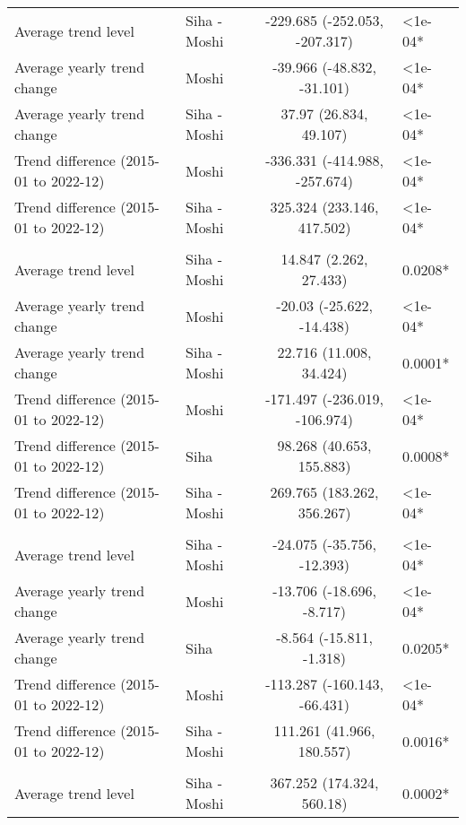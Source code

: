 \begin{longtable}{l|lcl}
\midrule\addlinespace[2.5pt]
\multicolumn{4}{l}{Neurological} \\[2.5pt] 
\midrule\addlinespace[2.5pt]
Average trend level & Siha - Moshi & -229.685 (-252.053, -207.317) & <1e-04* \\ 
Average yearly trend change & Moshi & -39.966 (-48.832, -31.101) & <1e-04* \\ 
Average yearly trend change & Siha - Moshi & 37.97 (26.834, 49.107) & <1e-04* \\ 
Trend difference (2015-01 to 2022-12) & Moshi & -336.331 (-414.988, -257.674) & <1e-04* \\ 
Trend difference (2015-01 to 2022-12) & Siha - Moshi & 325.324 (233.146, 417.502) & <1e-04* \\ 
\midrule\addlinespace[2.5pt]
\multicolumn{4}{l}{Other Communicable Diseases} \\[2.5pt] 
\midrule\addlinespace[2.5pt]
Average trend level & Siha - Moshi & 14.847 (2.262, 27.433) & 0.0208* \\ 
Average yearly trend change & Moshi & -20.03 (-25.622, -14.438) & <1e-04* \\ 
Average yearly trend change & Siha - Moshi & 22.716 (11.008, 34.424) & 0.0001* \\ 
Trend difference (2015-01 to 2022-12) & Moshi & -171.497 (-236.019, -106.974) & <1e-04* \\ 
Trend difference (2015-01 to 2022-12) & Siha & 98.268 (40.653, 155.883) & 0.0008* \\ 
Trend difference (2015-01 to 2022-12) & Siha - Moshi & 269.765 (183.262, 356.267) & <1e-04* \\ 
\midrule\addlinespace[2.5pt]
\multicolumn{4}{l}{Respiratory Diseases} \\[2.5pt] 
\midrule\addlinespace[2.5pt]
Average trend level & Siha - Moshi & -24.075 (-35.756, -12.393) & <1e-04* \\ 
Average yearly trend change & Moshi & -13.706 (-18.696, -8.717) & <1e-04* \\ 
Average yearly trend change & Siha & -8.564 (-15.811, -1.318) & 0.0205* \\ 
Trend difference (2015-01 to 2022-12) & Moshi & -113.287 (-160.143, -66.431) & <1e-04* \\ 
Trend difference (2015-01 to 2022-12) & Siha - Moshi & 111.261 (41.966, 180.557) & 0.0016* \\ 
\midrule\addlinespace[2.5pt]
\multicolumn{4}{l}{Respiratory Infections} \\[2.5pt] 
\midrule\addlinespace[2.5pt]
Average trend level & Siha - Moshi & 367.252 (174.324, 560.18) & 0.0002* \\ 

\end{longtable}
